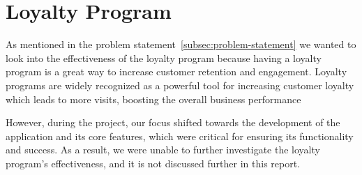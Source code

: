 \section{Loyalty Program}\label{sec:loyalty-program}

As mentioned in the problem statement~\ref{subsec:problem-statement} we wanted to look into the effectiveness
of the loyalty program because having a loyalty program is a great way to increase customer retention and
engagement.
Loyalty programs are widely recognized as a powerful tool for increasing customer loyalty which leads to more visits,
boosting the overall business performance

However, during the project, our focus shifted towards the development of the application and its core features,
which were critical for ensuring its functionality and success.
As a result, we were unable to further investigate the loyalty program's effectiveness,
and it is not discussed further in this report.
